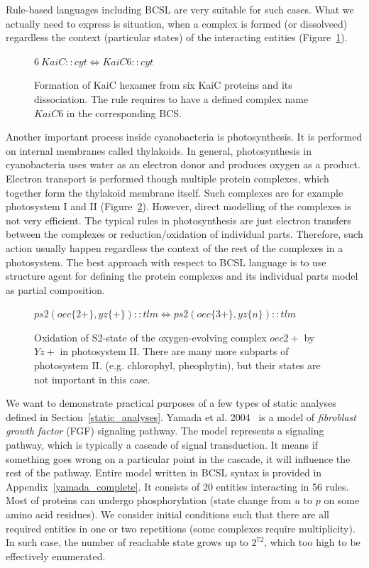 \documentclass[12pt]{fithesis2}
\begin{document}
Rule-based languages including BCSL are very suitable for such cases. What we actually need to express is situation, when a complex is formed (or dissolveed) regardless the context (particular states) of the interacting entities (Figure~\ref{hexamer_rule}).

\begin{figure}[!h]
{\small
\begin{center}
$ 6 ~KaiC::cyt \Leftrightarrow KaiC6::cyt $
\end{center}
}
\caption{Formation of KaiC hexamer from six KaiC proteins and its dissociation. The rule requires to have a defined complex name $KaiC6$ in the corresponding BCS.}\label{hexamer_rule}
\end{figure}

Another important process inside cyanobacteria is photosynthesis. It is performed on internal membranes called thylakoids. In general, photosynthesis in cyanobacteria uses water as an electron donor and produces oxygen as a product. Electron transport is performed though multiple protein complexes, which together form the thylakoid membrane itself. Such complexes are for example photosystem I and II (Figure~\ref{ps2_rule}). However, direct modelling of the complexes is not very efficient. The typical rules in photosynthesis are just electron transfers between the complexes or reduction/oxidation of individual parts. Therefore, such action usually happen regardless the context of the rest of the complexes in a photosystem. The best approach with respect to BCSL language is to use structure agent for defining the protein complexes and its individual parts model as partial composition.

\begin{figure}[!h]
{\small
\begin{center}
$ ps2(oec\{2+\}, yz\{+\})::tlm \Leftrightarrow ps2(oec\{3+\}, yz\{n\})::tlm $
\end{center}
}
\caption{Oxidation of S2-state of the oxygen-evolving complex $oec{2+}$ by $Yz{+}$ in photosystem II. There are many more subparts of photosystem II. (e.g. chlorophyl, pheophytin), but their states are not important in this case.}\label{ps2_rule}
\end{figure}

We want to demonstrate practical purposes of a few types of static analyses defined in Section~\ref{static_analyses}. Yamada et al. 2004~\cite{yamada2004model} is a model of \emph{fibroblast growth factor} (FGF) signaling pathway. The model represents a signaling pathway, which is typically a cascade of signal transduction. It means if something goes wrong on a particular point in the cascade, it will influence the rest of the pathway. Entire model written in BCSL syntax is provided in Appendix~\ref{yamada_complete}. It consists of 20 entities interacting in 56 rules. Most of proteins can undergo phosphorylation (state change from $u$ to $p$ on some amino acid residues). We consider initial conditions such that there are all required entities in one or two repetitions (some complexes require multiplicity). In such case, the number of reachable state grows up to $2^{72}$, which too high to be effectively enumerated.
\end{document}
